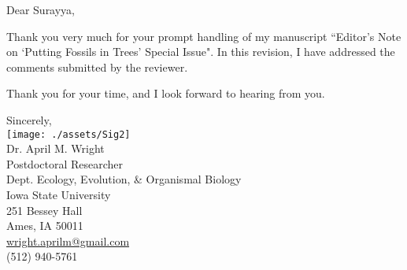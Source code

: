 \documentclass[12pt]{article}
\begin{document}
Dear Surayya,

Thank you very much for your prompt handling of my manuscript ``Editor's Note on `Putting Fossils in Trees' Special Issue". In this revision, I have addressed the comments submitted by the reviewer.

Thank you for your time, and I look forward to hearing from you.

\vspace{6mm}
\noindent Sincerely,\\
\texttt{[image: ./assets/Sig2]}\\
\noindent Dr. April M. Wright\\
Postdoctoral Researcher\\
Dept. Ecology, Evolution, \& Organismal Biology\\
Iowa State University\\
251 Bessey Hall\\
Ames, IA 50011\\
\href{mailto:wright.aprilm@gmail.com}{{wright.aprilm@gmail.com}}\\
(512) 940-5761

	
\end{document}
